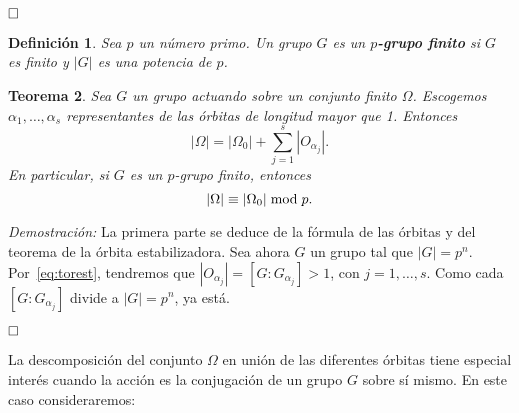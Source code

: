 \documentclass[12pt]{article}
\newtheorem{theorem}{Teorema}[section]
\newtheorem{definition}[theorem]{Definición}
\begin{document}
$\hfill \square$

\begin{definition}Sea $p$ un número primo. Un grupo $G$ es un \textbf{$p$-grupo finito} si $G$ es finito y $|G|$ es una potencia de $p$.
\end{definition}

\begin{theorem}\label{eq:ecClasesp}
Sea $G$ un grupo actuando sobre un conjunto finito $\Omega$. Escogemos $\alpha_1, \ldots, \alpha_s$ representantes de las órbitas de longitud mayor que 1. Entonces $$|\Omega| = |\Omega_0| + \sum_{j=1}^s |O_{\alpha_j}|.$$ En particular, si $G$ es un $p$-grupo finito, entonces $$|\Omega| \equiv |\Omega_0|\hspace{0.1cm} \text{mod}\hspace{0.1cm} p.$$
\end{theorem}
\emph{Demostración: }La primera parte se deduce de la fórmula de las órbitas y del teorema de la órbita estabilizadora. Sea ahora $G$ un grupo tal que $|G| = p^n$. Por~\ref{eq:torest}, tendremos que $|O_{\alpha_j}| = [G:G_{\alpha_j}] > 1$, con $j = 1, \ldots , s$. Como cada $[G:G_{\alpha_j}]$ divide a $|G| = p^n$, ya está.

$\hfill \square$

La descomposición del conjunto $\Omega$ en unión de las diferentes órbitas tiene especial interés cuando la acción es la conjugación de un grupo $G$ sobre sí mismo. En este caso consideraremos: 
\end{document}
